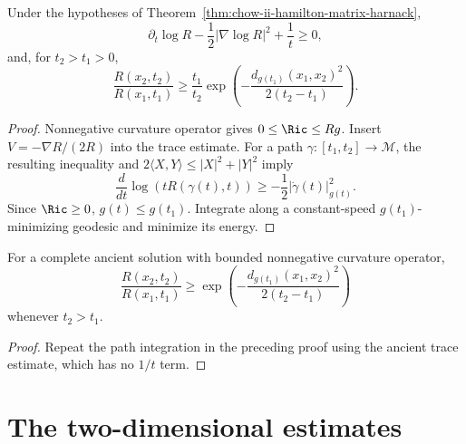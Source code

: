 \begin{corollary}
\label{cor:chow-ii-scalar-curvature-spacetime-comparison}
Under the hypotheses of Theorem~\ref{thm:chow-ii-hamilton-matrix-harnack},
\[
\partial_t\log R-\frac12|\nabla\log R|^2+\frac1t\ge0,
\]
and, for \(t_2>t_1>0\),
\[
\frac{R(x_2,t_2)}{R(x_1,t_1)}\ge\frac{t_1}{t_2}
\exp\!\left(-\frac{d_{g(t_1)}(x_1,x_2)^2}{2(t_2-t_1)}\right).
\]
\end{corollary}
\begin{proof}
\sketch Nonnegative curvature operator gives \(0\le\Ric\le Rg\).  Insert
\(V=-\nabla R/(2R)\) into the trace estimate.  For a path
\(\gamma:[t_1,t_2]\to\mathcal M\), the resulting inequality and
\(2\langle X,Y\rangle\le|X|^2+|Y|^2\) imply
\[
\frac d{dt}\log(tR(\gamma(t),t))\ge-\frac12|\dot\gamma(t)|_{g(t)}^2.
\]
Since \(\Ric\ge0\), \(g(t)\le g(t_1)\).  Integrate along a constant-speed
\(g(t_1)\)-minimizing geodesic and minimize its energy.
\end{proof}

\begin{corollary}
\label{cor:chow-ii-ancient-scalar-curvature-spacetime-comparison}
For a complete ancient solution with bounded nonnegative curvature operator,
\[
\frac{R(x_2,t_2)}{R(x_1,t_1)}\ge
\exp\!\left(-\frac{d_{g(t_1)}(x_1,x_2)^2}{2(t_2-t_1)}\right)
\]
whenever \(t_2>t_1\).
\end{corollary}
\begin{proof}
\sketch Repeat the path integration in the preceding proof using the ancient trace
estimate, which has no \(1/t\) term.
\end{proof}

\section{The two-dimensional estimates}

